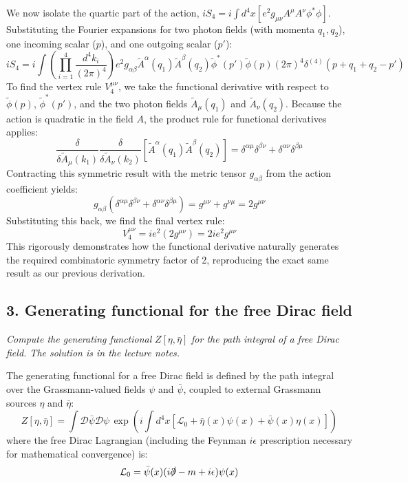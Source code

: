 We now isolate the quartic part of the action, $iS_4 = i \int d^4x \left[ e^2 g_{\mu\nu} A^\mu A^\nu \phi^* \phi \right]$.
Substituting the Fourier expansions for two photon fields (with momenta $q_1, q_2$), one incoming scalar ($p$), and one outgoing scalar ($p'$):
\[
    iS_4 = i \int \left( \prod_{i=1}^4 \frac{d^4k_i}{(2\pi)^4} \right) e^2 g_{\alpha\beta} \tilde{A}^\alpha(q_1) \tilde{A}^\beta(q_2) \tilde{\phi}^*(p') \tilde{\phi}(p) (2\pi)^4 \delta^{(4)}(p + q_1 + q_2 - p')
\]
To find the vertex rule $V_4^{\mu\nu}$, we take the functional derivative with respect to $\tilde{\phi}(p)$, $\tilde{\phi}^*(p')$, and the two photon fields $\tilde{A}_\mu(q_1)$ and $\tilde{A}_\nu(q_2)$. Because the action is quadratic in the field $A$, the product rule for functional derivatives applies:
\[
    \frac{\delta}{\delta \tilde{A}_\mu(k_1)} \frac{\delta}{\delta \tilde{A}_\nu(k_2)} \left[ \tilde{A}^\alpha(q_1) \tilde{A}^\beta(q_2) \right] = \delta^{\alpha\mu} \delta^{\beta\nu} + \delta^{\alpha\nu} \delta^{\beta\mu}
\]
Contracting this symmetric result with the metric tensor $g_{\alpha\beta}$ from the action coefficient yields:
\[
    g_{\alpha\beta} (\delta^{\alpha\mu} \delta^{\beta\nu} + \delta^{\alpha\nu} \delta^{\beta\mu}) = g^{\mu\nu} + g^{\nu\mu} = 2g^{\mu\nu}
\]
Substituting this back, we find the final vertex rule:
\[
    V_4^{\mu\nu} = i e^2 (2g^{\mu\nu}) = 2ie^2 g^{\mu\nu}
\]
This rigorously demonstrates how the functional derivative naturally generates the required combinatoric symmetry factor of 2, reproducing the exact same result as our previous derivation.


\subsection*{3. Generating functional for the free Dirac field}

\begin{center}
    \textit{Compute the generating functional } $Z[\eta, \bar{\eta}]$ \textit{ for the path integral of a free Dirac field. The solution is in the lecture notes.}
\end{center}

The generating functional for a free Dirac field is defined by the path integral over the Grassmann-valued fields $\psi$ and $\bar{\psi}$, coupled to external Grassmann sources $\eta$ and $\bar{\eta}$:
\[
    Z[\eta, \bar{\eta}] = \int \mathcal{D}\bar{\psi} \mathcal{D}\psi \, \exp\left( i \int d^4x \left[ \mathcal{L}_0 + \bar{\eta}(x)\psi(x) + \bar{\psi}(x)\eta(x) \right] \right)
\]
where the free Dirac Lagrangian (including the Feynman $i\epsilon$ prescription necessary for mathematical convergence) is:
\[
    \mathcal{L}_0 = \bar{\psi}(x) (i\slashed{\partial} - m + i\epsilon) \psi(x)
\]

